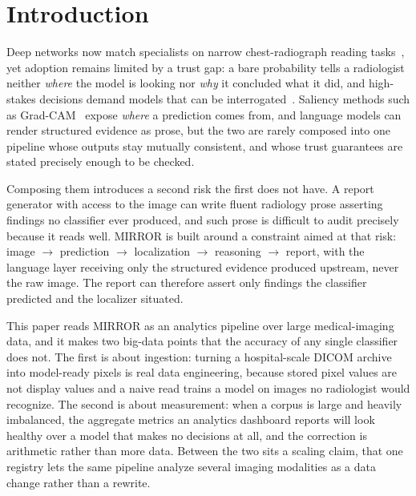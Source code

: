 \documentclass[conference]{IEEEtran}
\begin{document}
\section{Introduction}

Deep networks now match specialists on narrow chest-radiograph reading
tasks~\cite{rajpurkar2017chexnet}, yet adoption remains limited by a trust gap: a
bare probability tells a radiologist neither \emph{where} the model is looking nor
\emph{why} it concluded what it did, and high-stakes decisions demand models that
can be interrogated~\cite{rudin2019stop}. Saliency methods such as
Grad-CAM~\cite{selvaraju2017gradcam} expose \emph{where} a prediction comes from,
and language models can render structured evidence as prose, but the two are rarely
composed into one pipeline whose outputs stay mutually consistent, and whose trust
guarantees are stated precisely enough to be checked.

Composing them introduces a second risk the first does not have. A report
generator with access to the image can write fluent radiology prose asserting
findings no classifier ever produced, and such prose is difficult to audit
precisely because it reads well. MIRROR is built around a constraint aimed at that
risk: image $\rightarrow$ prediction $\rightarrow$ localization $\rightarrow$
reasoning $\rightarrow$ report, with the language layer receiving only the
structured evidence produced upstream, never the raw image. The report can
therefore assert only findings the classifier predicted and the localizer situated.

This paper reads MIRROR as an analytics pipeline over large medical-imaging data,
and it makes two big-data points that the accuracy of any single classifier does
not. The first is about ingestion: turning a hospital-scale DICOM archive into
model-ready pixels is real data engineering, because stored pixel values are not
display values and a naive read trains a model on images no radiologist would
recognize. The second is about measurement: when a corpus is large and heavily
imbalanced, the aggregate metrics an analytics dashboard reports will look healthy
over a model that makes no decisions at all, and the correction is arithmetic rather
than more data. Between the two sits a scaling claim, that one registry lets the
same pipeline analyze several imaging modalities as a data change rather than a
rewrite.
\end{document}

